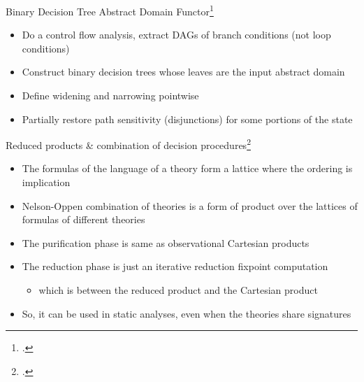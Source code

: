 \documentclass[aspectratio=169]{beamer}
\begin{document}
\begin{frame}{Binary Decision Tree Abstract Domain Functor\footcite{chen2015binary}}
  \begin{itemize}[<+->]
  \item Do a control flow analysis, extract DAGs of branch conditions (not loop conditions)
  \item Construct binary decision trees whose leaves are the input abstract domain
  \item Define widening and narrowing pointwise
  \item Partially restore path sensitivity (disjunctions) for some portions of the state
  \end{itemize}
\end{frame}

\begin{frame}{Reduced products \& combination of decision procedures\footcite{cousot2011reduced}}
  \footnotesize
  \begin{itemize}[<+->]
  \item The formulas of the language of a theory form a lattice where the ordering is implication
  \item Nelson-Oppen combination of theories is a form of product over the lattices of formulas of different theories
  \item The purification phase is same as observational Cartesian products
  \item The reduction phase is just an iterative reduction fixpoint computation
    \begin{itemize}
    \item which is between the reduced product and the Cartesian product
    \end{itemize}
  \item So, it can be used in static analyses, even when the theories share signatures
  \end{itemize}
\end{frame}
\end{document}
